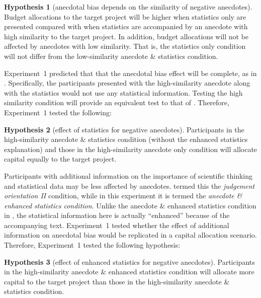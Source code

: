 \documentclass[a4paper, nobind]{templates/ociamthesis}
\theoremstyle{definition}
\theoremstyle{definition}
\theoremstyle{definition}
\theoremstyle{definition}
\newtheorem{hypothesis}{Hypothesis}[chapter]
\theoremstyle{remark}
\begin{document}
\begin{hypothesis}[anecdotal bias depends on the similarity of negative anecdotes]
\protect\hypertarget{hyp:anecdote-similarity-anecdotes-1}{}{\label{hyp:anecdote-similarity-anecdotes-1} \iffalse (anecdotal bias depends on the similarity of negative anecdotes) \fi{} }Budget allocations to the target project will be higher when statistics only are
presented compared with when statistics are accompanied by an anecdote with high
similarity to the target project. In addition, budget allocations will not be
affected by anecdotes with low similarity. That is, the statistics only
condition will not differ from the low-similarity anecdote \& statistics
condition.
\end{hypothesis}

Experiment~1 predicted that that the anecdotal bias effect will be complete, as
in \textcite{wainberg2013}. Specifically, the participants presented with the
high-similarity anecdote along with the statistics would not use any statistical
information. Testing the high similarity condition will provide an equivalent
test to that of \textcite{wainberg2013}. Therefore, Experiment~1 tested the following:

\begin{hypothesis}[effect of statistics for negative anecdotes]
\protect\hypertarget{hyp:statistics-anecdotes-1}{}{\label{hyp:statistics-anecdotes-1} \iffalse (effect of statistics for negative anecdotes) \fi{} }Participants in the high-similarity anecdote \& statistics condition (without the
enhanced statistics explanation) and those in the high-similarity anecdote only
condition will allocate capital equally to the target project.
\end{hypothesis}

Participants with additional information on the importance of scientific
thinking and statistical data may be less affected by anecdotes. \textcite{wainberg2018}
termed this the \emph{judgement orientation II} condition, while in this experiment
it is termed the \emph{anecdote \& enhanced statistics condition}. Unlike the anecdote
\& enhanced statistics condition in \textcite{wainberg2013}, the statistical information
here is actually ``enhanced'' because of the accompanying text. Experiment~1
tested whether the effect of additional information on anecdotal bias would be
replicated in a capital allocation scenario. Therefore, Experiment~1 tested the
following hypothesis:

\begin{hypothesis}[effect of enhanced statistics for negative anecdotes]
\protect\hypertarget{hyp:enhanced-statistics-anecdotes-1}{}{\label{hyp:enhanced-statistics-anecdotes-1} \iffalse (effect of enhanced statistics for negative anecdotes) \fi{} }Participants in the high-similarity anecdote \& enhanced statistics condition
will allocate more capital to the target project than those in the
high-similarity anecdote \& statistics condition.
\end{hypothesis}
\end{document}
